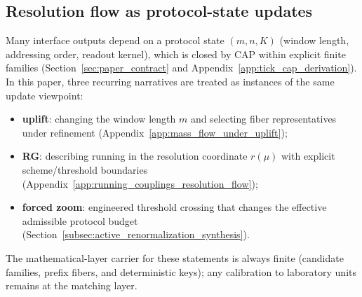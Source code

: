 \subsection*{Resolution flow as protocol-state updates}
\AuditTag Many interface outputs depend on a protocol state $(m,n,K)$ (window length, addressing order, readout kernel),
which is closed by CAP within explicit finite families (Section~\ref{sec:paper_contract} and Appendix~\ref{app:tick_cap_derivation}).
In this paper, three recurring narratives are treated as instances of the same update viewpoint:
\begin{itemize}
\item \textbf{uplift}: changing the window length $m$ and selecting fiber representatives under refinement (Appendix~\ref{app:mass_flow_under_uplift});
\item \textbf{RG}: describing running in the resolution coordinate $r(\mu)$ with explicit scheme/threshold boundaries (Appendix~\ref{app:running_couplings_resolution_flow});
\item \textbf{forced zoom}: engineered threshold crossing that changes the effective admissible protocol budget (Section~\ref{subsec:active_renormalization_synthesis}).
\end{itemize}
\AuditTag The mathematical-layer carrier for these statements is always finite (candidate families, prefix fibers, and deterministic keys);
any calibration to laboratory units remains at the matching layer.

